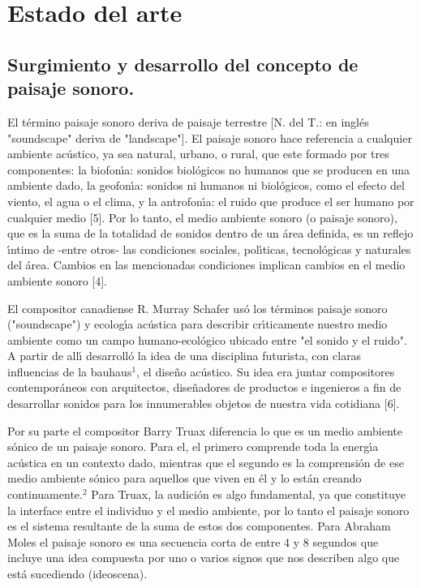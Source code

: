 \section{Estado del arte}

\subsection{Surgimiento y desarrollo del concepto de paisaje sonoro.}

El t\'{e}rmino paisaje sonoro deriva de paisaje terrestre [N. del T.: en
ingl\'{e}s "soundscape" deriva de "landscape"]. El paisaje sonoro hace
referencia a cualquier ambiente ac\'{u}stico, ya sea natural, urbano, o rural,
que este formado por tres componentes: la biofon\'{\i}a: sonidos
biol\'{o}gicos no humanos que se producen en una ambiente dado, la
geofon\'{\i}a: sonidos ni humanos ni biol\'{o}gicos, como el efecto del
viento, el agua o el clima, y la antrofon\'{\i}a: el ruido que produce el ser
humano por cualquier medio [5]. Por lo tanto, el medio ambiente sonoro (o
paisaje sonoro), que es la suma de la totalidad de sonidos dentro de un
\'{a}rea definida, es un reflejo \'{\i}ntimo de -entre otros- las condiciones
sociales, pol\'{\i}ticas, tecnol\'{o}gicas y naturales del \'{a}rea. Cambios
en las mencionadas condiciones implican cambios en el medio ambiente sonoro [4].

El compositor canadiense R. Murray Schafer us\'{o} los t\'{e}rminos paisaje
sonoro ("soundscape") y ecolog\'{\i}a ac\'{u}stica para describir
cr\'{\i}ticamente nuestro medio ambiente como un campo humano-ecol\'{o}gico
ubicado entre "el sonido y el ruido". A partir de all\'{\i} desarroll\'{o} la
idea de una disciplina futurista, con claras influencias de la bauhaus$^{1}$,
el dise\~{n}o ac\'{u}stico. Su idea era juntar compositores contempor\'{a}neos
con arquitectos, dise\~{n}adores de productos e ingenieros a fin de
desarrollar sonidos para los innumerables objetos de nuestra vida cotidiana [6].

Por su parte el compositor Barry Truax diferencia lo que es un medio ambiente
s\'{o}nico de un paisaje sonoro. Para el, el primero comprende toda la
energ\'{\i}a ac\'{u}stica en un contexto dado, mientras que el segundo es la
comprensi\'{o}n de ese medio ambiente s\'{o}nico para aquellos que viven en
\'{e}l y lo est\'{a}n creando continuamente.$^{2}$ Para Truax, la audici\'{o}n
es algo fundamental, ya que constituye la interface entre el individuo y el
medio ambiente, por lo tanto el paisaje sonoro es el sistema resultante de la
suma de estos dos componentes. Para Abraham Moles el paisaje sonoro es una
secuencia corta de entre 4 y 8 segundos que incluye una idea compuesta por uno
o varios signos que nos describen algo que est\'{a} sucediendo (ideoscena).

